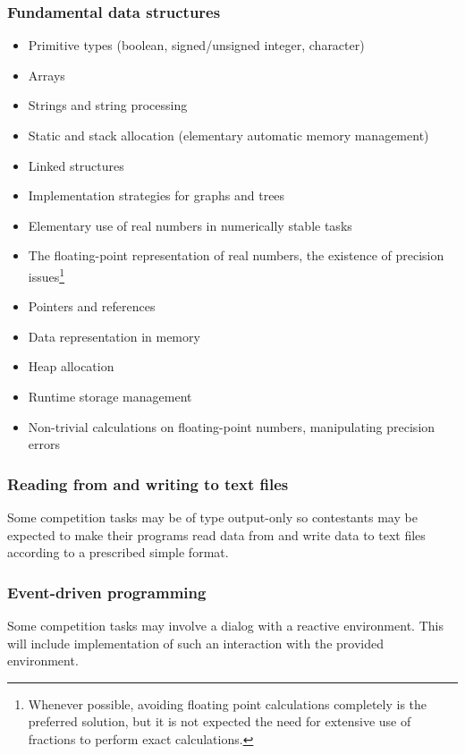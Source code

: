 \documentclass[12pt]{article}
\begin{document}
		\subsubsection{Fundamental data structures}
		\begin{itemize}[label=]
			\item Primitive types (boolean, signed/unsigned integer, character)
			\item Arrays
			\item Strings and string processing
			\item Static and stack allocation (elementary automatic memory management)
			\item Linked structures
			\item Implementation strategies for graphs and trees
			\item Elementary use of real numbers in numerically stable tasks
			\item The floating-point representation of real numbers, the existence of precision issues\footnote{Whenever possible, avoiding floating point calculations completely is the preferred solution, but it is not expected the need for extensive use of fractions to perform exact calculations.}
			\item Pointers and references
			\item Data representation in memory
		\end{itemize}
		
		\begin{itemize}[label=]
			\item Heap allocation
			\item Runtime storage management
			\item Non-trivial calculations on floating-point numbers, manipulating precision errors
		\end{itemize}
		
		\subsubsection{Reading from and writing to text files}
		Some competition tasks may be of type output-only so contestants may be expected to make their programs read data from and write data to text files according to a prescribed simple format.
		
		\subsubsection{Event-driven programming}
		Some competition tasks may involve a dialog with a reactive environment. This will include implementation of such an interaction with the provided environment.
		
\end{document}
